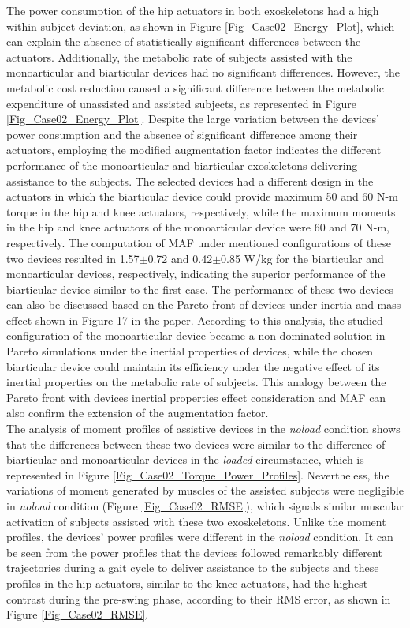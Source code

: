 \documentclass[10pt,letterpaper]{article}
\begin{document}
The power consumption of the hip actuators in both exoskeletons had a high within-subject deviation, as shown in Figure \ref{Fig_Case02_Energy_Plot}, which can explain the absence of statistically significant differences between the actuators.  Additionally, the metabolic rate of subjects assisted with the monoarticular and biarticular devices had no significant differences. However, the metabolic cost reduction caused a significant difference between the metabolic expenditure of unassisted and assisted subjects, as represented in Figure \ref{Fig_Case02_Energy_Plot}.
Despite the large variation between the devices' power consumption and the absence of significant difference among their actuators, employing the modified augmentation factor indicates the different performance of the monoarticular and biarticular exoskeletons delivering assistance to the subjects. The selected devices had a different design in the actuators in which the biarticular device could provide maximum 50 and 60 N-m torque in the hip and knee actuators, respectively, while the maximum moments in the hip and knee actuators of the monoarticular device were 60 and 70 N-m, respectively. The computation of MAF under mentioned configurations of these two devices resulted in 1.57$\pm$0.72 and 0.42$\pm$0.85 W/kg for the biarticular and monoarticular devices, respectively, indicating the superior performance of the biarticular device similar to the first case. The performance of these two devices can also be discussed based on the Pareto front of devices under inertia and mass effect shown in Figure 17 in the paper. According to this analysis, the studied configuration of the monoarticular device became a non dominated solution in Pareto simulations under the inertial properties of devices, while the chosen biarticular device could maintain its efficiency under the negative effect of its inertial properties on the metabolic rate of subjects. This analogy between the Pareto front with devices inertial properties effect consideration and MAF can also confirm the extension of the augmentation factor.\\
The analysis of moment profiles of assistive devices in the {\it noload} condition shows that the differences between these two devices were similar to the difference of biarticular and monoarticular devices in the {\it loaded} circumstance, which is represented in Figure \ref{Fig_Case02_Torque_Power_Profiles}. Nevertheless, the variations of moment generated by muscles of the assisted subjects were negligible in {\it noload} condition (Figure \ref{Fig_Case02_RMSE}), which signals similar muscular activation of subjects assisted with these two exoskeletons. Unlike the moment profiles, the devices' power profiles were different in the {\it noload} condition. It can be seen from the power profiles that the devices followed remarkably different trajectories during a gait cycle to deliver assistance to the subjects and these profiles in the hip actuators, similar to the knee actuators, had the highest contrast during the pre-swing phase, according to their RMS error, as shown in Figure \ref{Fig_Case02_RMSE}.\\
\end{document}
